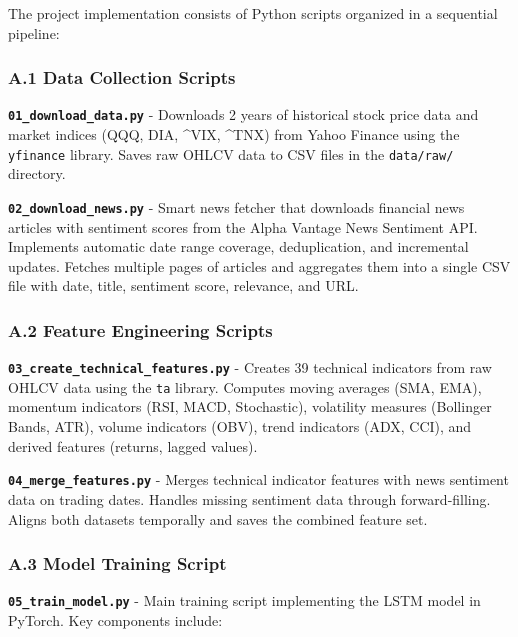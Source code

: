 \documentclass[
]{article}
\begin{document}
The project implementation consists of Python scripts organized in a
sequential pipeline:

\subsubsection{A.1 Data Collection
Scripts}\label{a1-data-collection-scripts}

\textbf{\texttt{01\_download\_data.py}} - Downloads 2 years of
historical stock price data and market indices (QQQ, DIA, \^{}VIX,
\^{}TNX) from Yahoo Finance using the \texttt{yfinance} library. Saves
raw OHLCV data to CSV files in the \texttt{data/raw/} directory.

\textbf{\texttt{02\_download\_news.py}} - Smart news fetcher that
downloads financial news articles with sentiment scores from the Alpha
Vantage News Sentiment API. Implements automatic date range coverage,
deduplication, and incremental updates. Fetches multiple pages of
articles and aggregates them into a single CSV file with date, title,
sentiment score, relevance, and URL.

\subsubsection{A.2 Feature Engineering
Scripts}\label{a2-feature-engineering-scripts}

\textbf{\texttt{03\_create\_technical\_features.py}} - Creates 39
technical indicators from raw OHLCV data using the \texttt{ta} library.
Computes moving averages (SMA, EMA), momentum indicators (RSI, MACD,
Stochastic), volatility measures (Bollinger Bands, ATR), volume
indicators (OBV), trend indicators (ADX, CCI), and derived features
(returns, lagged values).

\textbf{\texttt{04\_merge\_features.py}} - Merges technical indicator
features with news sentiment data on trading dates. Handles missing
sentiment data through forward-filling. Aligns both datasets temporally
and saves the combined feature set.

\subsubsection{A.3 Model Training
Script}\label{a3-model-training-script}

\textbf{\texttt{05\_train\_model.py}} - Main training script
implementing the LSTM model in PyTorch. Key components include:
\end{document}
